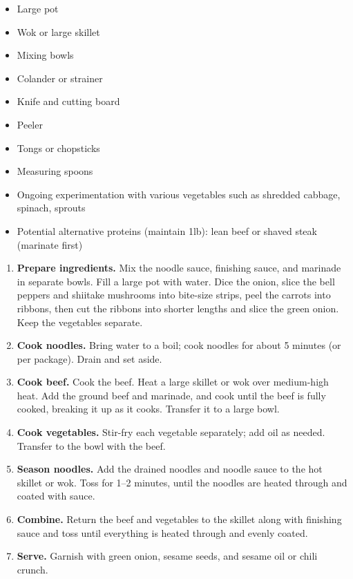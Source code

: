 \begin{minipage}[t]{0.35\linewidth}
\begin{itemize}
\item Large pot
\item Wok or large skillet
\item Mixing bowls
\item Colander or strainer
\item Knife and cutting board
\item Peeler
\item Tongs or chopsticks
\item Measuring spoons
\end{itemize}
\vspace{5pt}
\begin{itemize}
\item Ongoing experimentation with various vegetables such as shredded cabbage, spinach, sprouts
\item Potential alternative proteins (maintain 1lb): lean beef or shaved steak (marinate first)
\end{itemize}
\end{minipage}
\begin{enumerate}
\item \textbf{Prepare ingredients.} Mix the noodle sauce, finishing sauce, and marinade in separate bowls. Fill a large pot with water. Dice the onion, slice the bell peppers and shiitake mushrooms into bite-size strips, peel the carrots into ribbons, then cut the ribbons into shorter lengths and slice the green onion. Keep the vegetables separate.
\item \textbf{Cook noodles.} Bring water to a boil; cook noodles for about 5 minutes (or per package). Drain and set aside.
\item \textbf{Cook beef.} Cook the beef. Heat a large skillet or wok over medium-high heat. Add the ground beef and marinade, and cook until the beef is fully cooked, breaking it up as it cooks. Transfer it to a large bowl.
\item \textbf{Cook vegetables.} Stir-fry each vegetable separately; add oil as needed. Transfer to the bowl with the beef.
\item \textbf{Season noodles.} Add the drained noodles and noodle sauce to the hot skillet or wok. Toss for 1–2 minutes, until the noodles are heated through and coated with sauce.
\item \textbf{Combine.} Return the beef and vegetables to the skillet along with finishing sauce and toss until everything is heated through and evenly coated.
\item \textbf{Serve.} Garnish with green onion, sesame seeds, and sesame oil or chili crunch.
\end{enumerate}
\clearpage

